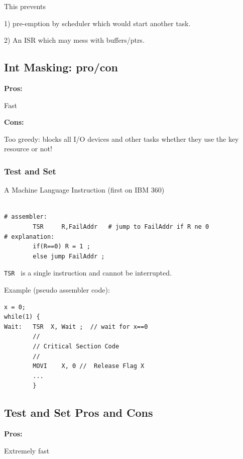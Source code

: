 This prevents

1) pre-emption by scheduler which would
start another task.

2) An ISR which may mess with
buffers/ptrs.

\subsection*{Int Masking: pro/con}

\noindent
{\bf Pros:}

  Fast

\noindent
{\bf Cons:}

Too greedy:  blocks all I/O devices and other tasks whether
they use the key resource or not!


\subsubsection{Test and Set}

A Machine Language Instruction (first on IBM 360)

\begin{verbatim}

# assembler:
        TSR     R,FailAddr   # jump to FailAddr if R ne 0
# explanation:
        if(R==0) R = 1 ;
        else jump FailAddr ;
\end{verbatim}

{\tt TSR } is a single instruction and cannot be interrupted.

Example (pseudo assembler code):
\begin{verbatim}
x = 0;
while(1) {
Wait:   TSR  X, Wait ;  // wait for x==0
        //
        // Critical Section Code
        //
        MOVI    X, 0 //  Release Flag X
        ...
        }
\end{verbatim}


\subsection*{Test and Set Pros and Cons}

{\bf Pros:}

 Extremely fast

